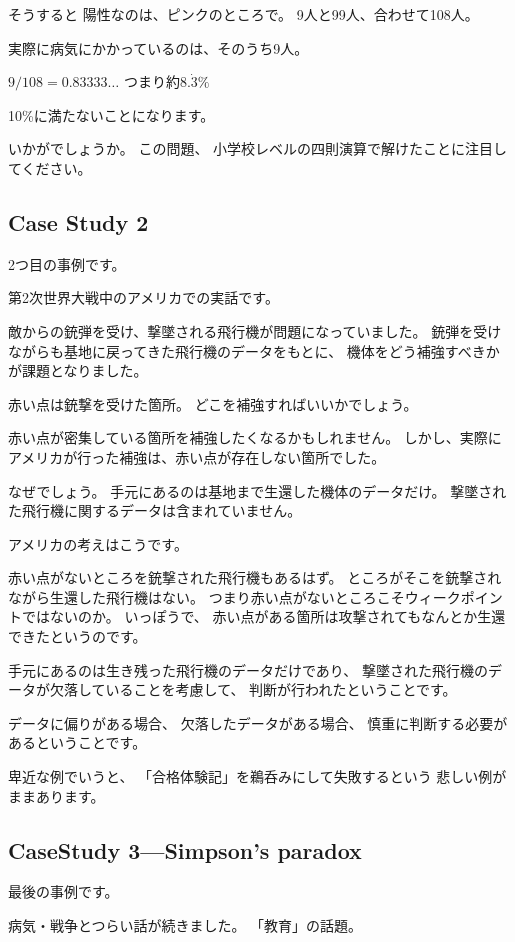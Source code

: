 \documentclass[uplatex,jis2004,dvipdfmx,12pt]{jsarticle}
\begin{document}
そうすると
陽性なのは、ピンクのところで。
9人と99人、合わせて108人。

実際に病気にかかっているのは、そのうち9人。

$9/108=0.83333\dots$
つまり約$8.\dot{3}\%$

10\%に満たないことになります。

いかがでしょうか。
この問題、
小学校レベルの四則演算で解けたことに注目してください。

\subsection{Case Study 2}

2つ目の事例です。

第2次世界大戦中のアメリカでの実話です。


敵からの銃弾を受け、撃墜される飛行機が問題になっていました。
銃弾を受けながらも基地に戻ってきた飛行機のデータをもとに、
機体をどう補強すべきかが課題となりました。

赤い点は銃撃を受けた箇所。
どこを補強すればいいかでしょう。

赤い点が密集している箇所を補強したくなるかもしれません。
しかし、実際にアメリカが行った補強は、赤い点が存在しない箇所でした。


なぜでしょう。
手元にあるのは基地まで生還した機体のデータだけ。
撃墜された飛行機に関するデータは含まれていません。

アメリカの考えはこうです。


赤い点がないところを銃撃された飛行機もあるはず。
ところがそこを銃撃されながら生還した飛行機はない。
つまり赤い点がないところこそウィークポイントではないのか。
いっぽうで、
赤い点がある箇所は攻撃されてもなんとか生還できたというのです。

手元にあるのは生き残った飛行機のデータだけであり、
撃墜された飛行機のデータが欠落していることを考慮して、
判断が行われたということです。

データに偏りがある場合、
欠落したデータがある場合、
慎重に判断する必要があるということです。

卑近な例でいうと、
「合格体験記」を鵜呑みにして失敗するという
悲しい例がままあります。


\subsection{CaseStudy 3---Simpson's paradox}
最後の事例です。

病気・戦争とつらい話が続きました。
「教育」の話題。
\end{document}
